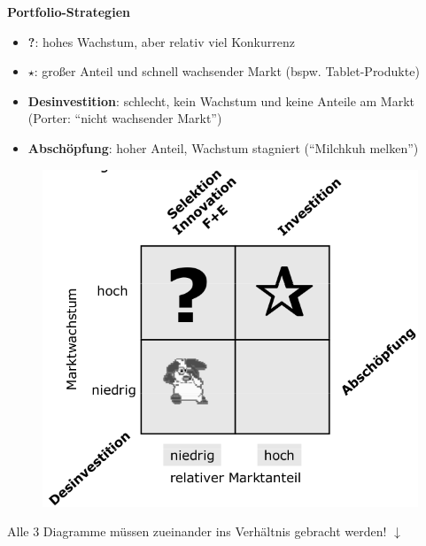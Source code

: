 \documentclass[a4paper,11pt, twoside]{article}
\begin{document}
\textbf{Portfolio-Strategien}
\begin{itemize}
	\item \textbf{?}: hohes Wachstum, aber relativ viel Konkurrenz\\
	\item \textbf{$\star$}: großer Anteil und schnell wachsender Markt (bspw. Tablet-Produkte)\\
	\item \textbf{Desinvestition}: schlecht, kein Wachstum und keine Anteile am Markt (Porter: "`nicht wachsender Markt"') 
	\item \textbf{Abschöpfung}: hoher Anteil, Wachstum stagniert ("`Milchkuh melken"')
\end{itemize}
\begin{figure}[h]
 \begin{center}
   \includegraphics[scale=0.3]{bilder/portfolio.png}
 \end{center}
\end{figure}
\begin{center}
Alle 3 Diagramme müssen zueinander ins Verhältnis gebracht werden! $\downarrow$
\end{center}
\end{document}
